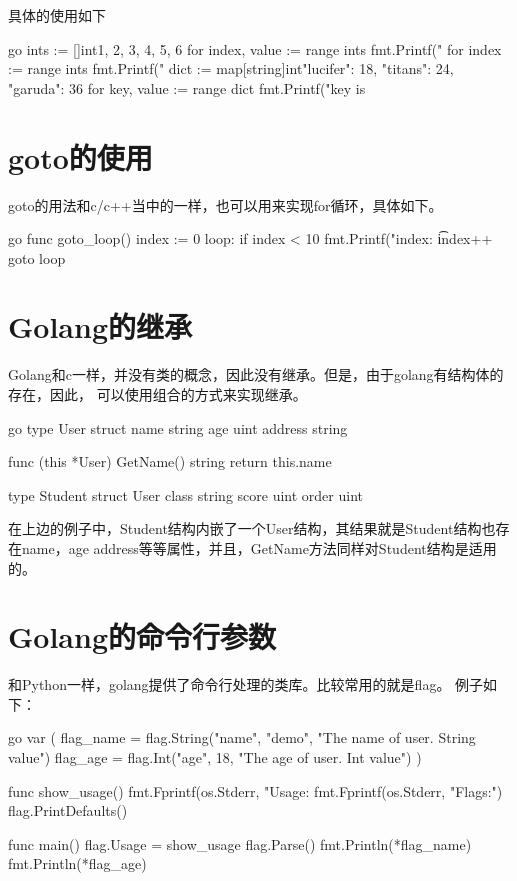 具体的使用如下
\begin{code-block}{go}
ints := []int{1, 2, 3, 4, 5, 6}
for index, value := range ints {
    fmt.Printf("%
}
for index := range ints {
    fmt.Printf("%
}
dict := map[string]int{"lucifer": 18, "titans": 24, "garuda": 36}
for key, value := range dict {
    fmt.Printf("key is %
}
\end{code-block}

\section{goto的使用}
goto的用法和c/c++当中的一样，也可以用来实现for循环，具体如下。
\begin{code-block}{go}
func goto_loop() {
    index := 0
loop:
    if index < 10 {
        fmt.Printf("index: \t%
        index++
        goto loop
    }
}
\end{code-block}

\section{Golang的继承}
Golang和c一样，并没有类的概念，因此没有继承。但是，由于golang有结构体的存在，因此，
可以使用组合的方式来实现继承。
\begin{code-block}{go}
type User struct{
    name string
    age uint
    address string
}

func (this *User) GetName() string{
    return this.name
}

type Student struct{
    User
    class string
    score uint
    order uint
}
\end{code-block}

在上边的例子中，Student结构内嵌了一个User结构，其结果就是Student结构也存在name，age
address等等属性，并且，GetName方法同样对Student结构是适用的。

\section{Golang的命令行参数}
和Python一样，golang提供了命令行处理的类库。比较常用的就是flag。
例子如下：
\begin{code-block}{go}
var (
    flag_name = flag.String("name", "demo", "The name of user. String value")
    flag_age  = flag.Int("age", 18, "The age of user. Int value")
)

func show_usage() {
    fmt.Fprintf(os.Stderr, "Usage: %
    fmt.Fprintf(os.Stderr, "Flags:\n")
    flag.PrintDefaults()
}

func main(){
    flag.Usage = show_usage
    flag.Parse()
    fmt.Println(*flag_name)
    fmt.Println(*flag_age)
}
\end{code-block}

